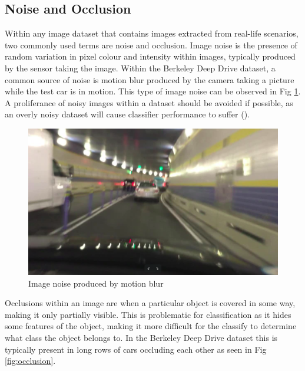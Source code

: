 \documentclass[12pt]{report}
\begin{document}
\subsection{Noise and Occlusion}
\begin{flushleft}
Within any image dataset that contains images extracted from real-life scenarios, two commonly used terms are noise and occlusion. Image noise is the presence of random variation in pixel colour and intensity within images, typically produced by the sensor taking the image. Within the Berkeley Deep Drive dataset, a common source of noise is motion blur produced by the camera taking a picture while the test car is in motion. This type of image noise can be observed in Fig \ref{fig:noiseimg}. A proliferance of noisy images within a dataset should be avoided if possible, as an overly noisy dataset will cause classifier performance to suffer (\cite{xiao2015learning}).
\end{flushleft}

\vspace{0.5cm}
\begin{figure}[ht!]
	\centering
	\includegraphics[width=12cm]{noise}
	\caption{Image noise produced by motion blur}
	\label{fig:noiseimg}
\end{figure}

\newpage
\begin{flushleft}
Occlusions within an image are when a particular object is covered in some way, making it only partially visible. This is problematic for classification as it hides some features of the object, making it more difficult for the classify to determine what class the object belongs to. In the Berkeley Deep Drive dataset this is typically present in long rows of cars occluding each other as seen in Fig \ref{fig:occlusion}.
\end{flushleft}
\end{document}

